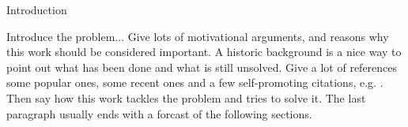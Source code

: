 %
\begin{section}{Introduction}\label{sec:Introduction}

  Introduce the problem...  Give lots of motivational arguments, and
  reasons why this work should be considered important. A historic
  background is a nice way to point out what has been done and what is
  still unsolved.  Give a lot of references some popular ones, some
  recent ones and a few self-promoting citations, e.g. \cite{Denzel16,
    Denzel19}.  Then say how this work tackles the problem and tries
  to solve it.  The last paragraph usually ends with a forcast of the
  following sections.
 
\end{section}
